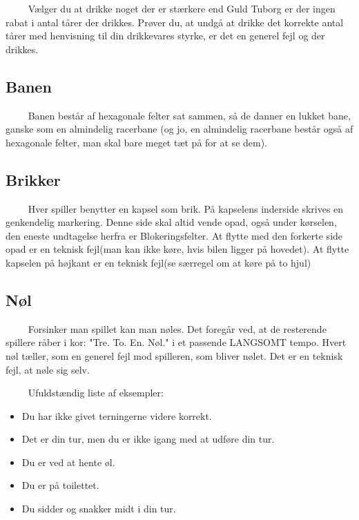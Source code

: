 \documentclass[12pt]{article}
\begin{document}
$\qquad$ Vælger du at drikke noget der er stærkere end Guld Tuborg er der ingen rabat i antal tårer der drikkes. Prøver du, at undgå at drikke det korrekte antal tårer med henvisning til din drikkevares styrke, er det en generel fejl og der drikkes.

\subsection*{Banen}

$\qquad$ Banen består af hexagonale felter sat sammen, så de danner en lukket bane, ganske som en almindelig racerbane (og jo, en almindelig racerbane består også af hexagonale felter, man skal bare meget tæt på for at se dem).

\subsection*{Brikker}

$\qquad$ Hver spiller benytter en kapsel som brik. På kapselens inderside skrives en genkendelig markering. Denne side skal altid vende opad, også under kørselen, den eneste undtagelse herfra er Blokeringsfelter. At flytte med den forkerte side opad er en teknisk fejl(man kan ikke køre, hvis bilen ligger på hovedet). At flytte kapselen på højkant er en teknisk fejl(se særregel om at køre på to hjul)

\subsection*{Nøl}

$\qquad$ Forsinker man spillet kan man nøles. Det foregår ved, at de resterende spillere råber i kor: "Tre. To. En. Nøl." i et passende LANGSOMT tempo. Hvert nøl tæller, som en generel fejl mod spilleren, som bliver nølet. Det er en teknisk fejl, at nøle sig selv.

$\qquad$ Ufuldstændig liste af eksempler: 

\begin{itemize}
	\item Du har ikke givet terningerne videre korrekt.
	\item Det er din tur, men du er ikke igang med at udføre din tur.
	\item Du er ved at hente øl.
	\item Du er på toilettet.
	\item Du sidder og snakker midt i din tur.
\end{itemize}
\end{document}
